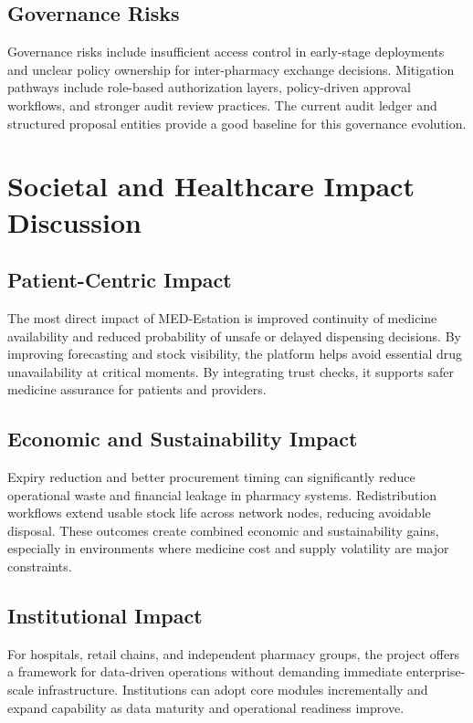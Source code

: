 \documentclass[12pt,a4paper]{article}
\begin{document}
\subsection{Governance Risks}
Governance risks include insufficient access control in early-stage deployments and unclear policy ownership for inter-pharmacy exchange decisions. Mitigation pathways include role-based authorization layers, policy-driven approval workflows, and stronger audit review practices. The current audit ledger and structured proposal entities provide a good baseline for this governance evolution.

\section{Societal and Healthcare Impact Discussion}
\subsection{Patient-Centric Impact}
The most direct impact of MED-Estation is improved continuity of medicine availability and reduced probability of unsafe or delayed dispensing decisions. By improving forecasting and stock visibility, the platform helps avoid essential drug unavailability at critical moments. By integrating trust checks, it supports safer medicine assurance for patients and providers.

\subsection{Economic and Sustainability Impact}
Expiry reduction and better procurement timing can significantly reduce operational waste and financial leakage in pharmacy systems. Redistribution workflows extend usable stock life across network nodes, reducing avoidable disposal. These outcomes create combined economic and sustainability gains, especially in environments where medicine cost and supply volatility are major constraints.

\subsection{Institutional Impact}
For hospitals, retail chains, and independent pharmacy groups, the project offers a framework for data-driven operations without demanding immediate enterprise-scale infrastructure. Institutions can adopt core modules incrementally and expand capability as data maturity and operational readiness improve.
\end{document}
